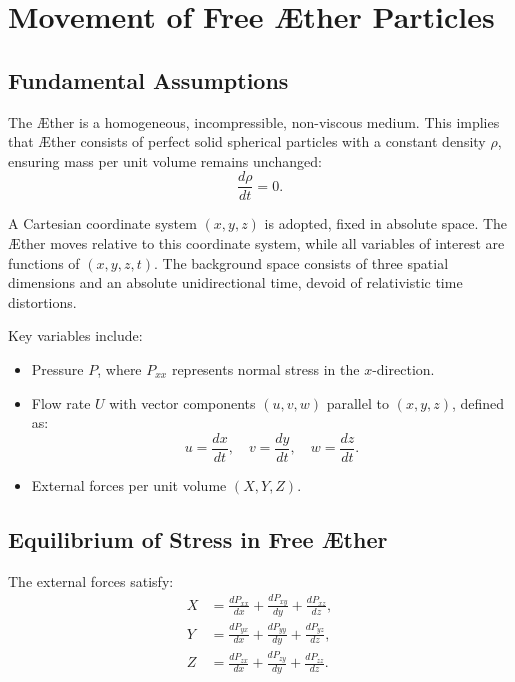 

    \section{Movement of Free Æther Particles}

    \subsection*{Fundamental Assumptions}
    The Æther is a homogeneous, incompressible, non-viscous medium. This implies that Æther consists of perfect solid spherical particles with a constant density $\rho$, ensuring mass per unit volume remains unchanged:
    \begin{equation}
        \frac{d \rho}{d t} = 0.
    \end{equation}

    A Cartesian coordinate system $(x, y, z)$ is adopted, fixed in absolute space. The Æther moves relative to this coordinate system, while all variables of interest are functions of $(x, y, z, t)$. The background space consists of three spatial dimensions and an absolute unidirectional time, devoid of relativistic time distortions.

    Key variables include:
    \begin{itemize}
        \item Pressure $P$, where $P_{xx}$ represents normal stress in the $x$-direction.
        \item Flow rate $U$ with vector components $(u, v, w)$ parallel to $(x, y, z)$, defined as:
        \begin{equation}
            u = \frac{dx}{dt}, \quad v = \frac{dy}{dt}, \quad w = \frac{dz}{dt}.
        \end{equation}
        \item External forces per unit volume $(X, Y, Z)$.
    \end{itemize}

    \subsection*{Equilibrium of Stress in Free Æther}
    The external forces satisfy:
    \begin{align}
        X &= \frac{d P_{xx}}{dx} + \frac{d P_{xy}}{dy} + \frac{d P_{xz}}{dz}, \\
        Y &= \frac{d P_{yx}}{dx} + \frac{d P_{yy}}{dy} + \frac{d P_{yz}}{dz}, \\
        Z &= \frac{d P_{zx}}{dx} + \frac{d P_{zy}}{dy} + \frac{d P_{zz}}{dz}.
    \end{align}


